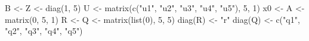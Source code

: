 \begin{Schunk}
\begin{Sinput}
 B <- Z <- diag(1, 5)
 U <- matrix(c("u1", "u2", "u3", "u4", "u5"), 5, 1)
 x0 <- A <- matrix(0, 5, 1)
 R <- Q <- matrix(list(0), 5, 5)
 diag(R) <- "r"
 diag(Q) <- c("q1", "q2", "q3", "q4", "q5")
\end{Sinput}
\end{Schunk}
